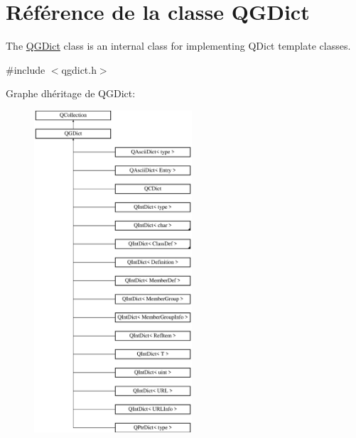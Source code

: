 \hypertarget{class_q_g_dict}{}\section{Référence de la classe Q\+G\+Dict}
\label{class_q_g_dict}


The \hyperlink{class_q_g_dict}{Q\+G\+Dict} class is an internal class for implementing Q\+Dict template classes.  




{\ttfamily \#include $<$qgdict.\+h$>$}

Graphe d\textquotesingle{}héritage de Q\+G\+Dict\+:\begin{figure}[H]
\begin{center}
\leavevmode
\includegraphics[height=12.000000cm]{class_q_g_dict}
\end{center}
\end{figure}
